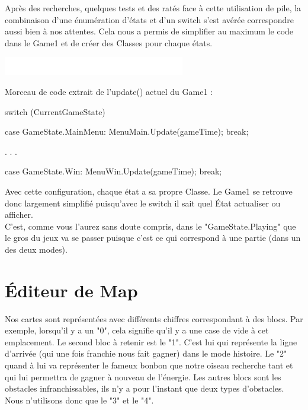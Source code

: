 \documentclass [11pt]{report}
\begin{document}
		Après des recherches, quelques tests et des ratés face à cette utilisation de pile, la combinaison d'une énumération d'états et d'un switch s'est avérée correspondre aussi bien à nos attentes. Cela nous a permis de simplifier au maximum le code dans le Game1 et de créer des Classes pour chaque états.\\
				
		\newpage	
			\begin{center}
						\includegraphics[scale = 0.3]{images/blanc.png}
					\end{center}
		\noindent Morceau de code extrait de l'update() actuel du Game1 :
		
		
		\begin{mylisting}
	switch (CurrentGameState)
	{
		case GameState.MainMenu:
			MenuMain.Update(gameTime);
			break;
			
			.
			.
			.
			
		case GameState.Win:
			MenuWin.Update(gameTime);
			break;
	}
				\end{mylisting}
		
		\vspace{10mm}
		
		Avec cette configuration, chaque état a sa propre Classe. Le Game1 se retrouve donc largement simplifié puisqu'avec le switch il sait quel État actualiser ou afficher.\\
		
			
		C'est, comme vous l'aurez sans doute compris, dans le "GameState.Playing" que le gros du jeux va se passer puisque c'est ce qui correspond à une partie (dans un des deux modes).
		
		
		\vspace{10mm}
		\newpage
		
		
		
	\section{\'Editeur de Map}
						
			Nos cartes sont représentées avec différents chiffres correspondant à des blocs. Par exemple, lorsqu'il y a un "0", cela signifie qu'il y a une case de vide à cet emplacement. Le second bloc à retenir est le "1". C'est lui qui représente la ligne d'arrivée (qui une fois franchie nous fait gagner) dans le mode histoire. Le "2" quand à lui va représenter le fameux bonbon que notre oiseau recherche tant et qui lui permettra de gagner à nouveau de l'énergie. Les autres blocs sont les obstacles infranchissables, ils n'y a pour l'instant que deux types d'obstacles. Nous n'utilisons donc que le "3" et le "4".\\
			
\end{document}

